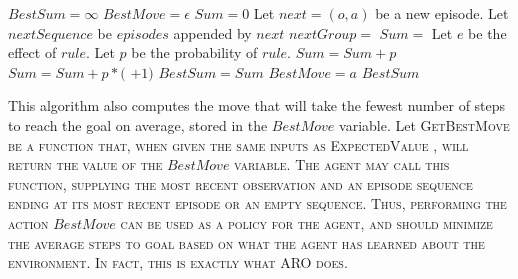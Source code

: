 \documentclass[letterpaper]{article} %
\begin{document}

\begin{algorithmic}[1]
		\State $BestSum = \infty$
		\State $BestMove = \epsilon$
			\State $Sum = 0$
			\State Let $next = (o, a)$ be a new episode.
			\State Let $nextSequence$ be $episodes$ appended by $next$
			\State $nextGroup =$  %
				\State $Sum = $  \label{line:heuristic}
			\EndIf
				\State Let $e$ be the effect of $rule$.
				\State Let $p$ be the probability of $rule$.
					\State $Sum = Sum + p$
				\Else
					\State $Sum = Sum + p*($ $ + 1)$
				\EndIf
			\EndFor
				\State $BestSum = Sum$
				\State $BestMove = a$
			\EndIf
		\EndFor
	\State \Return $BestSum$
	\EndFunction
\end{algorithmic}

This algorithm also computes the move that will take the fewest number of steps to reach the goal on average, stored in the $BestMove$ variable. Let \scshape GetBestMove \normalfont be a function that, when given the same inputs as \scshape ExpectedValue \normalfont, will return the value of the $BestMove$ variable. The agent may call this function, supplying the most recent observation and an episode sequence ending at its most recent episode or an empty sequence. Thus, performing the action $BestMove$ can be used as a policy for the agent, and should minimize the average steps to goal based on what the agent has learned about the environment. In fact, this is exactly what ARO does. 
\end{document}
